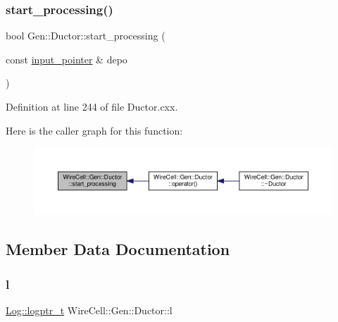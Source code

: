 \subsubsection{\texorpdfstring{start\+\_\+processing()}{start\_processing()}}
{\footnotesize\ttfamily bool Gen\+::\+Ductor\+::start\+\_\+processing (\begin{DoxyParamCaption}\item[{const \hyperlink{class_wire_cell_1_1_i_queuedout_node_acf5f716a764553f3c7055a9cf67e906e}{input\+\_\+pointer} \&}]{depo }\end{DoxyParamCaption})\hspace{0.3cm}{\ttfamily [protected]}}



Definition at line 244 of file Ductor.\+cxx.

Here is the caller graph for this function\+:
\nopagebreak
\begin{figure}[H]
\begin{center}
\leavevmode
\includegraphics[width=350pt]{class_wire_cell_1_1_gen_1_1_ductor_acf493c7246a3fb10a52edf8f9cba9e97_icgraph}
\end{center}
\end{figure}


\subsection{Member Data Documentation}
\mbox{\label{class_wire_cell_1_1_gen_1_1_ductor_a7c7a41733999959445c78c4f72b17687}} 
\subsubsection{\texorpdfstring{l}{l}}
{\footnotesize\ttfamily \hyperlink{namespace_wire_cell_1_1_log_a5147137d4bcdf4d35c235c5c1ec1495f}{Log\+::logptr\+\_\+t} Wire\+Cell\+::\+Gen\+::\+Ductor\+::l\hspace{0.3cm}{\ttfamily [protected]}}



